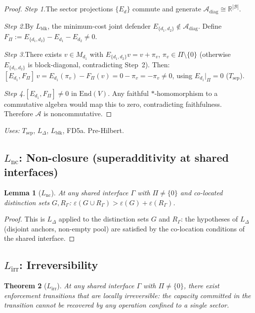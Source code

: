 \documentclass[11pt,a4paper]{article}
\newtheorem{theorem_app}{Theorem}[section]
\newtheorem{lemma_app}[theorem_app]{Lemma}
\theoremstyle{definition}
\begin{document}
\begin{proof}
\textit{Step 1.}\quad The sector projections $\{E_d\}$ commute and
generate $\mathcal{A}_{\mathrm{diag}} \cong \mathbb{R}^{|\mathcal{B}|}$.

\textit{Step 2.}\quad By $L_{\mathrm{blk}}$, the minimum-cost joint
defender $E_{\{d_1,d_2\}} \notin \mathcal{A}_{\mathrm{diag}}$.
Define $F_\Pi := E_{\{d_1,d_2\}} - E_{d_1} - E_{d_2} \ne 0$.

\textit{Step 3.}\quad There exists $v \in M_{d_1}$ with
$E_{\{d_1,d_2\}} v = v + \pi_v$, $\pi_v \in \Pi \setminus \{0\}$
(otherwise $E_{\{d_1,d_2\}}$ is block-diagonal, contradicting Step~2).
Then:
$[E_{d_1}, F_\Pi]\,v = E_{d_1}(\pi_v) - F_\Pi(v) = 0 - \pi_v
= -\pi_v \ne 0$,
using $E_{d_1}|_\Pi = 0$ ($T_{\mathrm{sep}}$).

\textit{Step 4.}\quad $[E_{d_1}, F_\Pi] \ne 0$ in $\mathrm{End}(V)$.
Any faithful $*$-homomorphism to a commutative algebra would map this
to zero, contradicting faithfulness.  Therefore $\mathcal{A}$ is
noncommutative.
\end{proof}

\noindent\textit{Uses:} $T_{\mathrm{sep}}$, $L_\Delta$,
$L_{\mathrm{blk}}$, FD5a.  Pre-Hilbert.


\subsection{$L_{\mathrm{nc}}$: Non-closure (superadditivity at shared
interfaces)}
\label{app:Lnc}

\begin{lemma_app}[$L_{\mathrm{nc}}$]
At any shared interface $\Gamma$ with $\Pi \ne \{0\}$ and
co-located distinction sets $G, R_\Gamma$:
$\varepsilon(G \cup R_\Gamma) > \varepsilon(G)
+ \varepsilon(R_\Gamma)$.
\end{lemma_app}

\begin{proof}
This is $L_\Delta$ applied to the distinction sets $G$ and $R_\Gamma$:
the hypotheses of $L_\Delta$ (disjoint anchors, non-empty pool) are
satisfied by the co-location conditions of the shared interface.
\end{proof}


\subsection{$L_{\mathrm{irr}}$: Irreversibility}
\label{app:Lirr}

\begin{theorem_app}[$L_{\mathrm{irr}}$]
At any shared interface $\Gamma$ with $\Pi \ne \{0\}$, there exist
enforcement transitions that are locally irreversible: the capacity
committed in the transition cannot be recovered by any operation
confined to a single sector.
\end{theorem_app}
\end{document}
